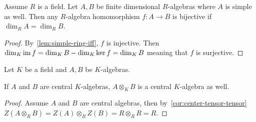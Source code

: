 \begin{corollary}\label{cor:alghom-bijective-of-dim-eq}
  Assume $R$ is a field. Let $A, B$ be finite dimensional $R$-algebras where $A$
  is simple as well. Then any $R$-algebra homomorphism $f:A\to B$ is bijective
  if $\dim_{R}A=\dim_{R}B$. \leanok
\end{corollary}
\begin{proof}
  By~\cref{lem:simple-ring-iff}, $f$ is injective. Then
  $\dim_{K}\operatorname{im} f = \dim_{K} B - \dim_{K}\ker f = \dim_{K}B$ meaning that $f$ is
  surjective.
\end{proof}

Let $K$ be a field and $A, B$ be $K$-algebras.
\begin{lemma}
  \label{lem:tensor-central}
  If $A$ and $B$ are central $K$-algebras, $A\otimes_{K}B$ is a central
  $K$-algebra as well. \leanok {}
\end{lemma}
\begin{proof}
  Assume $A$ and $B$ are central algebras, then
  by~\cref{cor:center-tensor-tensor}
  $Z\left(A\otimes_{R}B\right)=Z\left(A\right)\otimes_{R}Z\left(B\right)=R\otimes_{R}R=R$.
\end{proof}

